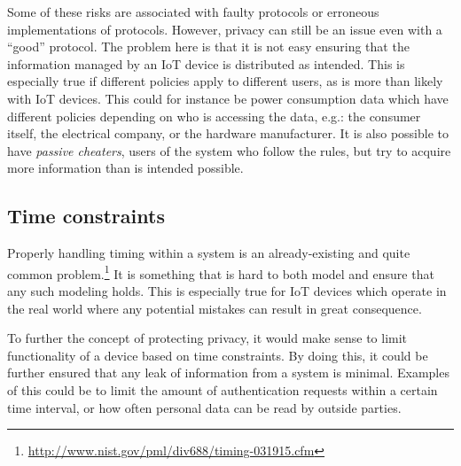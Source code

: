 Some of these risks are associated with faulty protocols or erroneous implementations of protocols.
However, privacy can still be an issue even with a ``good'' protocol.
The problem here is that it is not easy ensuring that the information managed by an IoT device is distributed as intended.
This is especially true if different policies apply to different users, as is more than likely with IoT devices.
This could for instance be power consumption data which have different policies depending on who is accessing the data, e.g.: the consumer itself, the electrical company, or the hardware manufacturer.
It is also possible to have \emph{passive cheaters}, users of the system who follow the rules, but try to acquire more information than is intended possible.

\subsection{Time constraints}
Properly handling timing within a system is an already-existing and quite common problem.\footnote{\url{http://www.nist.gov/pml/div688/timing-031915.cfm}}
It is something that is hard to both model and ensure that any such modeling holds.
This is especially true for IoT devices which operate in the real world where any potential mistakes can result in great consequence.

To further the concept of protecting privacy, it would make sense to limit functionality of a device based on time constraints.
By doing this, it could be further ensured that any leak of information from a system is minimal.
Examples of this could be to limit the amount of authentication requests within a certain time interval, or how often personal data can be read by outside parties.
